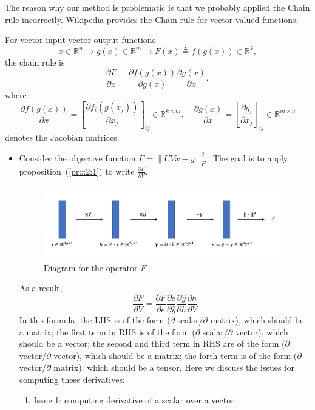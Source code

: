 \begin{example}
The reason why our method is problematic is that we probably applied the Chain rule incorrectly. 
Wikipedia provides the Chain rule for vector-valued functions:
\begin{proposition}\label{pro:2:1}
For vector-input vector-output functions
\[
x\in\mathbb{R}^{n}\to g(x)\in\mathbb{R}^m\to F(x)\triangleq f(g(x))\in\mathbb{R}^k,
\]
the chain rule is
\[
\frac{\partial F}{\partial x} = \frac{\partial f(g(x))}{\partial g(x)}\frac{\partial g(x)}{\partial x},
\]
where
\[
\frac{\partial f(g(x))}{\partial x}= \left[\frac{\partial f_i(g(x_j))}{\partial x_j}\right]_{ij}\in\mathbb{R}^{k\times m},\quad
\frac{\partial g(x)}{\partial x} = \left[\frac{\partial g_i}{\partial x_j}\right]_{ij}\in\mathbb{R}^{m\times n}
\]
denotes the Jacobian matrices.
\end{proposition}
\begin{itemize}
\item
Consider the objective function $F= \|UV x - y\|_F^2.$
The goal is to apply proposition~(\ref{pro:2:1}) to write $\frac{\partial F}{\partial V}$. 
\begin{figure}[H]
\centering
\includegraphics[width=\textwidth]{Second_lecture/p_3}
\caption{Diagram for the operator $F$}
\end{figure}
As a result,
\[
\frac{\partial F}{\partial V} = \frac{\partial F}{\partial e}\frac{\partial e}{\partial\hat{y}}\frac{\partial\hat{y}}{\partial h}\frac{\partial h}{\partial V}
\]
In this formula, the LHS is of the form ($\partial$ scalar/$\partial$ matrix), which should be a matrix;
the first term in RHS is of the form ($\partial$ scalar/$\partial$ vector), which should be a vector; the second and third term in RHS are of the form ($\partial$ vector/$\partial$ vector), which should be a matrix; the forth term is of the form ($\partial$ vector/$\partial$ matrix), which should be a tensor. 
Here we discuss the issues for computing these derivatives:
\begin{enumerate}
\item
Issue 1: computing derivative of a scalar over a vector.


\end{enumerate}
\end{itemize}
\end{example}
